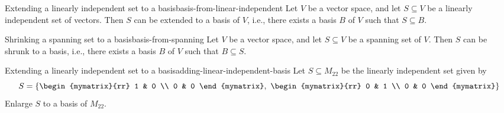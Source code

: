 \begin{proposition}{Extending a linearly independent set to a basis}{basis-from-linear-independent}
  Let $V$ be a vector space, and let $S\subseteq V$ be a linearly
  independent set of vectors. Then $S$ can be extended to a basis of
  $V$, i.e., there exists a basis $B$ of $V$ such that $S\subseteq
  B$.%
\end{proposition}

\begin{proposition}{Shrinking a spanning set to a basis}{basis-from-spanning}
  Let $V$ be a vector space, and let $S\subseteq V$ be a spanning set
  of $V$. Then $S$ can be shrunk to a basis, i.e., there exists a
  basis $B$ of $V$ such that $B\subseteq S$.
\end{proposition}

\begin{example}{Extending a linearly independent set to a basis}{adding-linear-independent-basis}
  Let $S \subseteq M_{22}$ be the linearly independent set given by
  \begin{equation*}
    S  = \set{
      \begin{mymatrix}{rr}
        1 & 0 \\
        0 & 0
      \end{mymatrix},~
      \begin{mymatrix}{rr}
        0 & 1 \\
        0 & 0
      \end{mymatrix} }
  \end{equation*}
  Enlarge $S$ to a basis of $M_{22}$.
\end{example}

